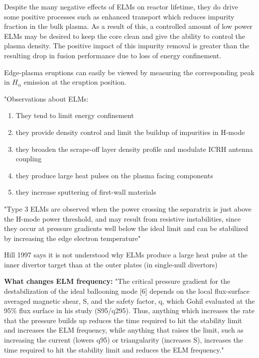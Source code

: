 \documentclass[12pt]{article}  %
\newcommand{\citep}[1]{\cite{#1}}
\begin{document}
Despite the many negative effects of ELMs on reactor lifetime, they do drive some positive processes such as enhanced transport which reduces impurity fraction in the bulk plasma. As a result of this, a controlled amount of low power ELMs may be desired to keep the core clean and give the ability to control the plasma density.\citep{Hill1997} The positive impact of this impurity removal is greater than the resulting drop in fusion performance due to loss of energy confinement.\cite{Connor2008}



Edge-plasma eruptions can easily be viewed by measuring the corresponding peak in $H_{\alpha}$ emission at the eruption position.\citep{Hill1997}

"Observations about ELMs: 
\begin{enumerate}
\item They tend to limit energy confinement
\item they provide density control and limit the buildup of impurities in H-mode
\item they broaden the scrape-off layer density profile and modulate ICRH antenna coupling
\item they produce large heat pulses on the plasma facing components 
\item they increase sputtering of first-wall materials
\end{enumerate}

"Type 3 ELMs are observed when the power crossing the separatrix is just above the H-mode power threshold, and may result from resistive instabilities, since they occur at pressure gradients well below the ideal limit and can be stabilized by increasing the edge electron temperature"\citep{Hill1997}

Hill 1997\cite{Hill1997} says it is not understood why ELMs produce a large heat pulse at the inner divertor target than at the outer plates (in single-null divertors)

\textbf{What changes ELM frequency:}
"The critical pressure gradient for the destabilization of the ideal ballooning mode [6] depends on the local flux-surface averaged magnetic shear, S, and the safety factor, q, which Gohil evaluated at the 95\% flux surface in his study (S95/q295). Thus, anything which increases the rate that the pressure builds up reduces the time required to hit the stability limit and increases the ELM frequency, while anything that raises the limit, such as increasing the current (lowers q95) or triangularity (increases S), increases the time required to hit the stability limit and reduces the ELM frequency."\cite{Hill1997}
\end{document}
